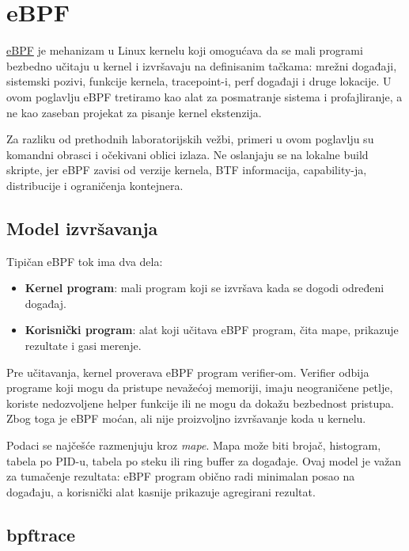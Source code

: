 \section{eBPF}\label{ebpf}

\href{https://ebpf.io/}{eBPF} je mehanizam u Linux kernelu koji omogućava da se mali programi bezbedno učitaju u kernel i izvršavaju na definisanim tačkama: mrežni događaji, sistemski pozivi, funkcije kernela, tracepoint-i, perf događaji i druge lokacije. U ovom poglavlju eBPF tretiramo kao alat za posmatranje sistema i profajliranje, a ne kao zaseban projekat za pisanje kernel ekstenzija.

Za razliku od prethodnih laboratorijskih vežbi, primeri u ovom poglavlju su komandni obrasci i očekivani oblici izlaza. Ne oslanjaju se na lokalne build skripte, jer eBPF zavisi od verzije kernela, BTF informacija, capability-ja, distribucije i ograničenja kontejnera.

\subsection{Model izvršavanja}\label{ebpf-model}

Tipičan eBPF tok ima dva dela:

\begin{itemize}
\tightlist
\item
  \textbf{Kernel program}: mali program koji se izvršava kada se dogodi određeni događaj.
\item
  \textbf{Korisnički program}: alat koji učitava eBPF program, čita mape, prikazuje rezultate i gasi merenje.
\end{itemize}

Pre učitavanja, kernel proverava eBPF program verifier-om. Verifier odbija programe koji mogu da pristupe nevažećoj memoriji, imaju neograničene petlje, koriste nedozvoljene helper funkcije ili ne mogu da dokažu bezbednost pristupa. Zbog toga je eBPF moćan, ali nije proizvoljno izvršavanje koda u kernelu.

Podaci se najčešće razmenjuju kroz \emph{mape}. Mapa može biti brojač, histogram, tabela po PID-u, tabela po steku ili ring buffer za događaje. Ovaj model je važan za tumačenje rezultata: eBPF program obično radi minimalan posao na događaju, a korisnički alat kasnije prikazuje agregirani rezultat.

\subsection{bpftrace}\label{ebpf-bpftrace}

